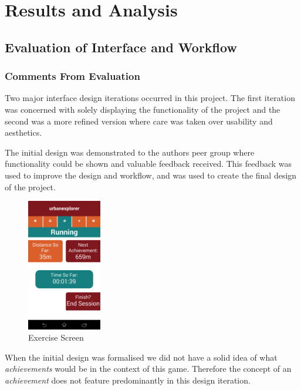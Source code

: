 \chapter{Results and Analysis}\label{ch_results}

\section{Evaluation of Interface and Workflow}
\subsection{Comments From Evaluation}
Two major interface design iterations occurred in this project. The
first iteration was concerned with solely displaying the functionality
of the project and the second was a more refined version where care
was taken over usability and aesthetics. 

The initial design was demonstrated to the authors peer group where
functionality could be shown and valuable feedback received. This
feedback was used to improve the design and workflow, and was used to
create the final design of the project. 

\begin{figure}
  \vspace{-35pt}
  \centering
  \includegraphics[width=0.29\textwidth]{images/init_design/run.png}
  \vspace{-20pt}
  \caption{Exercise Screen}
  \vspace{-25pt}
  \label{fig:init_run}
\end{figure}
When the initial design was formalised we did not have a solid idea of
what \emph{achievements} would be in the context of this
game. Therefore the concept of an \emph{achievement} does not feature
predominantly in this design iteration. 

